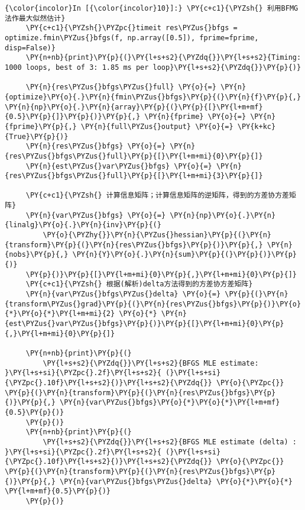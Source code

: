 \begin{Verbatim}[commandchars=\\\{\}]
{\color{incolor}In [{\color{incolor}10}]:} \PY{c+c1}{\PYZsh{} 利用BFMG法作最大似然估计}
     \PY{c+c1}{\PYZsh{}\PYZpc{}timeit res\PYZus{}bfgs = optimize.fmin\PYZus{}bfgs(f, np.array([0.5]), fprime=fprime, disp=False)}
     \PY{n+nb}{print}\PY{p}{(}\PY{l+s+s2}{\PYZdq{}}\PY{l+s+s2}{Timing: 1000 loops, best of 3: 1.85 ms per loop}\PY{l+s+s2}{\PYZdq{}}\PY{p}{)}

     \PY{n}{res\PYZus{}bfgs\PYZus{}full} \PY{o}{=} \PY{n}{optimize}\PY{o}{.}\PY{n}{fmin\PYZus{}bfgs}\PY{p}{(}\PY{n}{f}\PY{p}{,} \PY{n}{np}\PY{o}{.}\PY{n}{array}\PY{p}{(}\PY{p}{[}\PY{l+m+mf}{0.5}\PY{p}{]}\PY{p}{)}\PY{p}{,} \PY{n}{fprime} \PY{o}{=} \PY{n}{fprime}\PY{p}{,} \PY{n}{full\PYZus{}output} \PY{o}{=} \PY{k+kc}{True}\PY{p}{)}
     \PY{n}{res\PYZus{}bfgs} \PY{o}{=} \PY{n}{res\PYZus{}bfgs\PYZus{}full}\PY{p}{[}\PY{l+m+mi}{0}\PY{p}{]}
     \PY{n}{est\PYZus{}var\PYZus{}bfgs} \PY{o}{=} \PY{n}{res\PYZus{}bfgs\PYZus{}full}\PY{p}{[}\PY{l+m+mi}{3}\PY{p}{]}

     \PY{c+c1}{\PYZsh{} 计算信息矩阵；计算信息矩阵的逆矩阵，得到的方差协方差矩阵}
     \PY{n}{var\PYZus{}bfgs} \PY{o}{=} \PY{n}{np}\PY{o}{.}\PY{n}{linalg}\PY{o}{.}\PY{n}{inv}\PY{p}{(}
         \PY{o}{\PYZhy{}}\PY{n}{\PYZus{}hessian}\PY{p}{(}\PY{n}{transform}\PY{p}{(}\PY{n}{res\PYZus{}bfgs}\PY{p}{)}\PY{p}{,} \PY{n}{nobs}\PY{p}{,} \PY{n}{Y}\PY{o}{.}\PY{n}{sum}\PY{p}{(}\PY{p}{)}\PY{p}{)}
     \PY{p}{)}\PY{p}{[}\PY{l+m+mi}{0}\PY{p}{,}\PY{l+m+mi}{0}\PY{p}{]}
     \PY{c+c1}{\PYZsh{} 根据(解析)delta方法得到的方差协方差矩阵}
     \PY{n}{var\PYZus{}bfgs\PYZus{}delta} \PY{o}{=} \PY{p}{(}\PY{n}{transform\PYZus{}grad}\PY{p}{(}\PY{n}{res\PYZus{}bfgs}\PY{p}{)}\PY{o}{*}\PY{o}{*}\PY{l+m+mi}{2} \PY{o}{*} \PY{n}{est\PYZus{}var\PYZus{}bfgs}\PY{p}{)}\PY{p}{[}\PY{l+m+mi}{0}\PY{p}{,}\PY{l+m+mi}{0}\PY{p}{]}

     \PY{n+nb}{print}\PY{p}{(}
         \PY{l+s+s2}{\PYZdq{}}\PY{l+s+s2}{BFGS MLE estimate: }\PY{l+s+si}{\PYZpc{}.2f}\PY{l+s+s2}{ (}\PY{l+s+si}{\PYZpc{}.10f}\PY{l+s+s2}{)}\PY{l+s+s2}{\PYZdq{}} \PY{o}{\PYZpc{}} \PY{p}{(}\PY{n}{transform}\PY{p}{(}\PY{n}{res\PYZus{}bfgs}\PY{p}{)}\PY{p}{,} \PY{n}{var\PYZus{}bfgs}\PY{o}{*}\PY{o}{*}\PY{l+m+mf}{0.5}\PY{p}{)}
     \PY{p}{)}
     \PY{n+nb}{print}\PY{p}{(}
         \PY{l+s+s2}{\PYZdq{}}\PY{l+s+s2}{BFGS MLE estimate (delta) : }\PY{l+s+si}{\PYZpc{}.2f}\PY{l+s+s2}{ (}\PY{l+s+si}{\PYZpc{}.10f}\PY{l+s+s2}{)}\PY{l+s+s2}{\PYZdq{}} \PY{o}{\PYZpc{}} \PY{p}{(}\PY{n}{transform}\PY{p}{(}\PY{n}{res\PYZus{}bfgs}\PY{p}{)}\PY{p}{,} \PY{n}{var\PYZus{}bfgs\PYZus{}delta} \PY{o}{*}\PY{o}{*} \PY{l+m+mf}{0.5}\PY{p}{)}
     \PY{p}{)}
\end{Verbatim}

